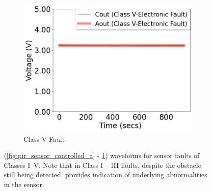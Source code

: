 \begin{figure}[b]
	\begin{subfigure}[t]{0.3\textwidth}
		\centering
		\includegraphics[width=\textwidth]{figures/2-PIR-Fault/normal-classV/classV_summary.png}
		\caption{Class V Fault}
		\label{fig:pir_sensor_controlled_e}
	\end{subfigure}
	\caption{(\ref{fig:pir_sensor_controlled_a} - \ref{fig:pir_sensor_controlled_e}) \footnotesize{\aout waveforms for sensor faults of Classes I--V}. Note that in Class I -- III faults, despite the obstacle still being detected, \aout provides indication of underlying abnormalities in the sensor.
	}
	\label{fig:pir_sensor_controlled_classI-V}
\end{figure}





